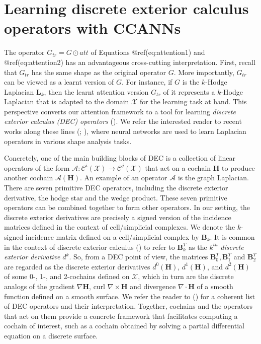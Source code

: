 \documentclass[
  12pt,
]{krantz}
\begin{document}
\section{Learning discrete exterior calculus operators with
CCANNs}\label{learning-discrete-exterior-calculus-operators-with-ccanns}

The operator \(G_{tr}=G\odot att\) of Equations @ref(eq:attention1) and
@ref(eq:attention2) has an advantageous cross-cutting interpretation.
First, recall that \(G_{tr}\) has the same shape as the original
operator \(G\). More importantly, \(G_{tr}\) can be viewed as a learnt
version of \(G\). For instance, if \(G\) is the \(k\)-Hodge Laplacian
\(\mathbf{L}_k\), then the learnt attention version \(G_{tr}\) of it
represents a \(k\)-Hodge Laplacian that is adapted to the domain
\(\mathcal{X}\) for the learning task at hand. This perspective converts
our attention framework to a tool for learning \emph{discrete exterior
calculus (DEC) operators} (). We refer the interested reader to recent works
along these lines (; ), where neural networks are used to learn Laplacian operators in
various shape analysis tasks.

Concretely, one of the main building blocks of DEC is a collection of
linear operators of the form
\(\mathcal{A} \colon \mathcal{C}^i(\mathcal{X}) \to \mathcal{C}^j(\mathcal{X})\)
that act on a cochain \(\mathbf{H}\) to produce another cochain
\(\mathcal{A}(\mathbf{H})\). An example of an operator \(\mathcal{A}\)
is the graph Laplacian. There are seven primitive DEC operators,
including the discrete exterior derivative, the hodge star and the wedge
product. These seven primitive operators can be combined together to
form other operators. In our setting, the discrete exterior derivatives
are precisely a signed version of the incidence matrices defined in the
context of cell/simplicial complexes. We denote the \(k\)-signed
incidence matrix defined on a cell/simplicial complex by
\(\mathbf{B}_k\). It is common in the context of discrete exterior
calculus () to refer to \(\mathbf{B}_k^T\) as the \(k^{th}\) \emph{discrete
exterior derivative} \(d^k\). So, from a DEC point of view, the matrices
\(\mathbf{B}_0^T, \mathbf{B}_1^T\) and \(\mathbf{B}_2^T\) are regarded
as the discrete exterior derivatives \(d^0(\mathbf{H})\),
\(d^1 (\mathbf{H})\), and \(d^2 (\mathbf{H})\) of some 0-, 1-, and
2-cochains defined on \(\mathcal{\mathcal{X}}\), which in turn are the
discrete analogs of the gradient \(\nabla \mathbf{H}\), curl
\(\nabla\times \mathbf{H}\) and divergence \(\nabla \cdot \mathbf{H}\)
of a smooth function defined on a smooth surface. We refer the reader to
() for
a coherent list of DEC operators and their interpretation. Together,
cochains and the operators that act on them provide a concrete framework
that facilitates computing a cochain of interest, such as a cochain
obtained by solving a partial differential equation on a discrete
surface.
\end{document}
